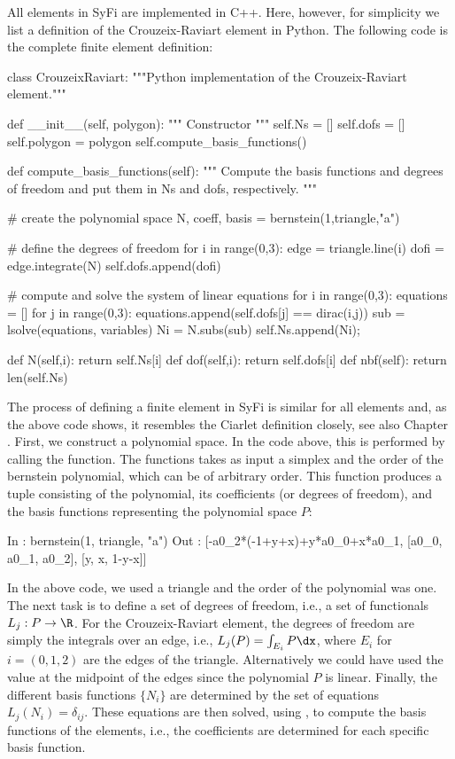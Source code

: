 All elements in SyFi are implemented in C++. Here, however, for simplicity we list a definition 
of the Crouzeix-Raviart element in Python.  The following code is the complete
finite element definition: 
\begin{code}
class CrouzeixRaviart: 
  """Python implementation of the Crouzeix-Raviart element.""" 

  def __init__(self, polygon):  
    """ Constructor """
    self.Ns = []
    self.dofs = []
    self.polygon = polygon 
    self.compute_basis_functions()

  def compute_basis_functions(self): 
    """ Compute the basis functions and degrees of freedom  
    and put them in Ns and dofs, respectively.  """

    # create the polynomial space
    N, coeff, basis = bernstein(1,triangle,"a")

    # define the degrees of freedom 
    for i in range(0,3): 
      edge = triangle.line(i)
      dofi = edge.integrate(N) 
      self.dofs.append(dofi)

    # compute and solve the system of linear equations
    for i in range(0,3): 
      equations = []
      for j in range(0,3): 
        equations.append(self.dofs[j] == dirac(i,j))
      sub = lsolve(equations, variables) 
      Ni = N.subs(sub) 
      self.Ns.append(Ni); 

  def N(self,i): return self.Ns[i]
  def dof(self,i): return self.dofs[i]
  def nbf(self): return len(self.Ns)
\end{code}
The process of defining a finite element in SyFi is similar for all elements and,
as the above code shows,  it resembles the Ciarlet definition closely, see also Chapter \cite{kirby-1}. 
First, we construct a polynomial space. In the code above, this is performed by calling the 
function. The  functions takes as input a simplex and the order of the bernstein polynomial, 
which can be of arbitrary order. This function produces a tuple consisting of 
the polynomial, its coefficients (or degrees of freedom), and the basis functions
representing the polynomial space $P$: 
\begin{code}
In  : bernstein(1, triangle, "a")
Out : [-a0_2*(-1+y+x)+y*a0_0+x*a0_1, [a0_0, a0_1, a0_2], [y, x, 1-y-x]]
\end{code}
In the above code, we used a triangle and the order of the polynomial was one. The next task is to 
define a set of degrees of freedom, i.e., a set of functionals $L_j : P \rightarrow \R$. 
For the Crouzeix-Raviart element, the degrees of freedom are simply the integrals 
over an edge, i.e., $L_j(P) = \int_{E_i} P \dx$, where $E_i$ for $i=(0,1,2)$ are the edges of 
the triangle. Alternatively we could have used
the value at the midpoint of the edges since the polynomial $P$ is linear. 
Finally, the different basis functions $\{N_i\}$ are determined by the  
set of equations $L_j(N_i) = \delta_{ij}$. 
These equations are then solved, using , to compute the basis functions of the elements, i.e., the
coefficients \emp{[a0\_0, a0\_1, a0\_2]}  are determined for each specific basis function.

